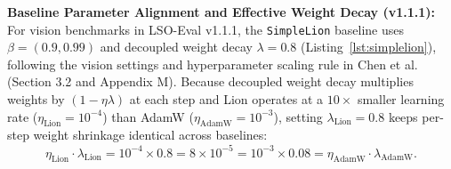 \documentclass[11pt,a4paper]{article}
\renewcommand{\_}{\origunderscore\allowbreak}
\begin{document}
\noindent
\textbf{Baseline Parameter Alignment and Effective Weight Decay (v1.1.1):} For vision benchmarks in LSO-Eval v1.1.1, the \texttt{SimpleLion} baseline uses $\beta = (0.9, 0.99)$ and decoupled weight decay $\lambda = 0.8$ (Listing~\ref{lst:simplelion}), following the vision settings and hyperparameter scaling rule in Chen et al.~\cite{chen2023lion} (Section 3.2 and Appendix M). Because decoupled weight decay multiplies weights by $(1 - \eta\lambda)$ at each step and Lion operates at a $10\times$ smaller learning rate ($\eta_{\text{Lion}} = 10^{-4}$) than AdamW ($\eta_{\text{AdamW}} = 10^{-3}$), setting $\lambda_{\text{Lion}} = 0.8$ keeps per-step weight shrinkage identical across baselines:
\begin{equation}
    \eta_{\text{Lion}} \cdot \lambda_{\text{Lion}} = 10^{-4} \times 0.8 = 8 \times 10^{-5} = 10^{-3} \times 0.08 = \eta_{\text{AdamW}} \cdot \lambda_{\text{AdamW}}.
\end{equation}
\end{document}
